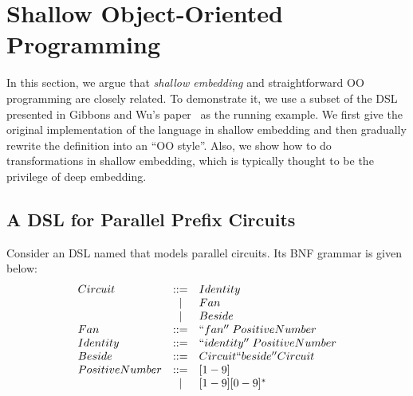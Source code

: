 \section{Shallow Object-Oriented Programming}\label{sec:oo}

\begin{comment}
Weixin writes this part.

Argue that shallow embeddings and straightforward OO 
programs are essentially the same thing. 

Start from a simple shallow DSL in Haskell, 
and iterate throught it until you reach a form 
that looks like an OO program.

Show how todo transformations in Shallow embeddings
using the insight of how to do transformations in OO
programs.

Show the correponding Java programs and the Java program 
with transformation that we can port back to Haskell.
\end{comment}

In this section, we argue that \emph{shallow embedding} and straightforward OO
programming are closely related. To demonstrate it, we use a subset
of the DSL presented in Gibbons and Wu's paper~\cite{} as the running example.
We first give the original implementation of the language in shallow embedding
and then gradually rewrite the definition into an ``OO style''. Also, we show how to do
transformations in shallow embedding, which is typically thought to be the
privilege of deep embedding.

\subsection{A DSL for Parallel Prefix Circuits}
Consider an DSL named \dsl that models parallel circuits.
Its BNF grammar is given below:
$$
\begin{array}{lcl}
Circuit & ::= & Identity \\
 & \mid & Fan \\
 & \mid & Beside \\
Fan & ::= & ``fan''\; PositiveNumber \\
Identity & ::= & ``identity''\;  PositiveNumber \\
Beside & ::= & Circuit ``beside'' Circuit \\
PositiveNumber & ::= & [1-9] \\
     & \mid & [1-9][0-9]^* \\
\end{array}
$$

